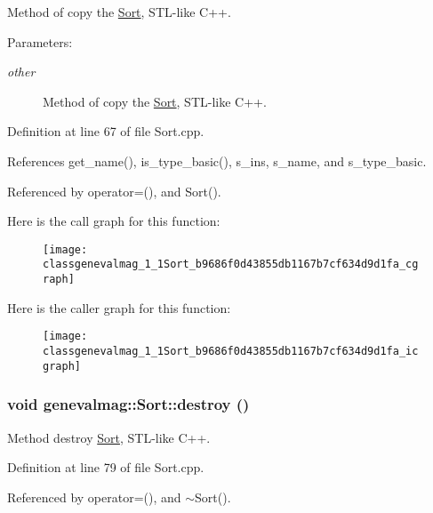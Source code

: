 Method of copy the \hyperlink{classgenevalmag_1_1Sort}{Sort}, STL-like C++. \begin{Desc}
\item[Parameters:]
\begin{description}
\item[{\em other}]Method of copy the \hyperlink{classgenevalmag_1_1Sort}{Sort}, STL-like C++. \end{description}
\end{Desc}


Definition at line 67 of file Sort.cpp.

References get\_\-name(), is\_\-type\_\-basic(), s\_\-ins, s\_\-name, and s\_\-type\_\-basic.

Referenced by operator=(), and Sort().

Here is the call graph for this function:\nopagebreak
\begin{figure}[H]
\begin{center}
\leavevmode
\texttt{[image: classgenevalmag\_1\_1Sort\_b9686f0d43855db1167b7cf634d9d1fa\_cgraph]}
\end{center}
\end{figure}


Here is the caller graph for this function:\nopagebreak
\begin{figure}[H]
\begin{center}
\leavevmode
\texttt{[image: classgenevalmag\_1\_1Sort\_b9686f0d43855db1167b7cf634d9d1fa\_icgraph]}
\end{center}
\end{figure}
\hypertarget{classgenevalmag_1_1Sort_c9c0f0525a72b060e253409712eafd70}{
\subsubsection[{destroy}]{\setlength{\rightskip}{0pt plus 5cm}void genevalmag::Sort::destroy ()}}
\label{classgenevalmag_1_1Sort_c9c0f0525a72b060e253409712eafd70}


Method destroy \hyperlink{classgenevalmag_1_1Sort}{Sort}, STL-like C++. 

Definition at line 79 of file Sort.cpp.

Referenced by operator=(), and $\sim$Sort().

